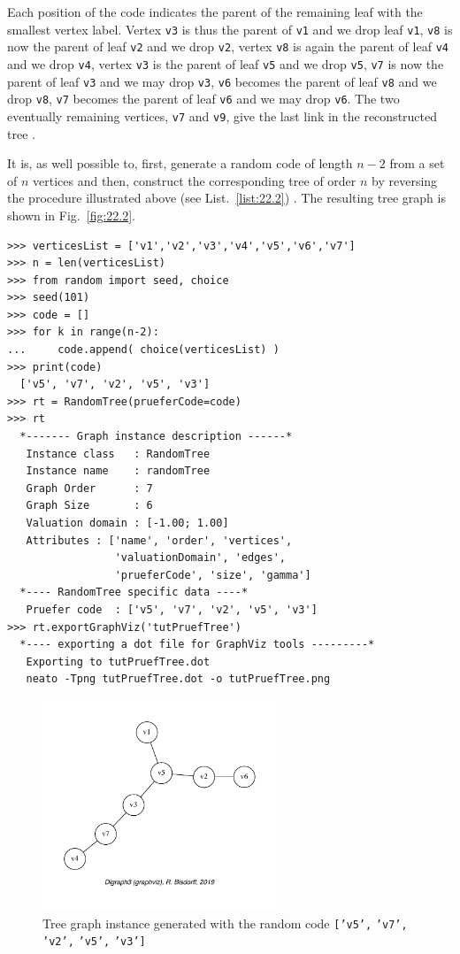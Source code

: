 Each position of the code indicates the parent of the remaining leaf with the smallest vertex label. Vertex \texttt{v3} is thus the parent of \texttt{v1} and we drop leaf \texttt{v1}, \texttt{v8} is now the parent of leaf \texttt{v2} and we drop \texttt{v2}, vertex \texttt{v8} is again the parent of leaf \texttt{v4} and we drop \texttt{v4}, vertex \texttt{v3} is the parent of leaf \texttt{v5} and we drop \texttt{v5}, \texttt{v7} is now the parent of leaf \texttt{v3} and we may drop \texttt{v3}, \texttt{v6} becomes the parent of leaf \texttt{v8} and we drop \texttt{v8}, \texttt{v7} becomes the parent of leaf \texttt{v6} and we may drop \texttt{v6}. The two eventually remaining vertices, \texttt{v7} and \texttt{v9}, give the last link in the reconstructed tree \citep{JPB-1991}.  

It is, as well possible to, first, generate a random \Pruefer code of length $n-2$ from a set of $n$ vertices and then, construct the corresponding tree of order $n$ by reversing the procedure illustrated above (see List.~\vref{list:22.2}) . The resulting tree graph is shown in Fig.~\vref{fig:22.2}.
\begin{lstlisting}[caption={Generating a tree graph with a random \Pruefer code.},label=list:22.2]
>>> verticesList = ['v1','v2','v3','v4','v5','v6','v7']
>>> n = len(verticesList)
>>> from random import seed, choice
>>> seed(101)
>>> code = []
>>> for k in range(n-2):
...     code.append( choice(verticesList) )
>>> print(code)
  ['v5', 'v7', 'v2', 'v5', 'v3']
>>> rt = RandomTree(prueferCode=code)
>>> rt
  *------- Graph instance description ------*
   Instance class   : RandomTree
   Instance name    : randomTree
   Graph Order      : 7
   Graph Size       : 6
   Valuation domain : [-1.00; 1.00]
   Attributes : ['name', 'order', 'vertices',
                 'valuationDomain', 'edges',
                 'prueferCode', 'size', 'gamma']
  *---- RandomTree specific data ----*
   Pruefer code  : ['v5', 'v7', 'v2', 'v5', 'v3']
>>> rt.exportGraphViz('tutPruefTree')
  *---- exporting a dot file for GraphViz tools ---------*
   Exporting to tutPruefTree.dot
   neato -Tpng tutPruefTree.dot -o tutPruefTree.png
\end{lstlisting}
\begin{figure}[ht]
\sidecaption[t]
\includegraphics[width=7cm]{Figures/22-2-tutPruefTree.pdf}
\caption[Tree graph generated with a random \Pruefer code]{Tree graph instance generated with the random \Pruefer code \texttt{['v5',} \texttt{'v7',} \texttt{'v2',} \texttt{'v5',} \texttt{'v3']}} 
\label{fig:22.2}       %
\end{figure}

